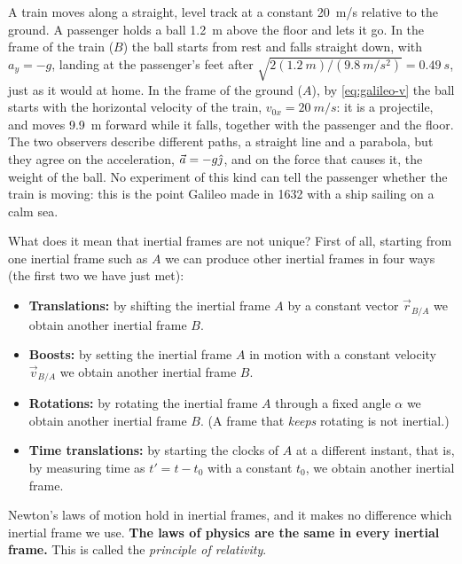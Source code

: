 \documentclass[11pt,a4paper]{article}
\begin{document}
\begin{example}
A train moves along a straight, level track at a constant \qty{20}{m/s} relative to the ground. A
passenger holds a ball \qty{1.2}{m} above the floor and lets it go. In the frame of the train ($B$)
the ball starts from rest and falls straight down, with $a_y = -g$, landing at the passenger's feet
after $\sqrt{2(\qty{1.2}{m})/(\qty{9.8}{m/s^2})} = \qty{0.49}{s}$, just as it would at home. In the
frame of the ground ($A$), by \eqref{eq:galileo-v} the ball starts with the horizontal velocity of
the train, $v_{0x} = \qty{20}{m/s}$: it is a projectile, and moves \qty{9.9}{m} forward while it
falls, together with the passenger and the floor. The two observers describe different paths, a
straight line and a parabola, but they agree on the acceleration, $\vec{a} = -g\hat{\jmath}$, and on the
force that causes it, the weight of the ball. No experiment of this kind can tell the passenger
whether the train is moving: this is the point Galileo made in 1632 with a ship sailing on a calm
sea.
\end{example}

What does it mean that inertial frames are not unique? First of all, starting from one inertial
frame such as $A$ we can produce other inertial frames in four ways (the first two we have just
met):
\begin{itemize}
  \item \textbf{Translations:} by shifting the inertial frame $A$ by a constant vector
    $\vec{r}_{B/A}$ we obtain another inertial frame $B$.
  \item \textbf{Boosts:} by setting the inertial frame $A$ in motion with a constant velocity
    $\vec{v}_{B/A}$ we obtain another inertial frame $B$.
  \item \textbf{Rotations:} by rotating the inertial frame $A$ through a fixed angle $\alpha$ we
    obtain another inertial frame $B$. (A frame that \emph{keeps} rotating is not inertial.)
  \item \textbf{Time translations:} by starting the clocks of $A$ at a different instant, that is,
    by measuring time as $t' = t - t_0$ with a constant $t_0$, we obtain another inertial frame.
\end{itemize}
Newton's laws of motion hold in inertial frames, and it makes no difference which inertial frame we
use. \textbf{The laws of physics are the same in every inertial frame.} This is called the
\emph{principle of relativity}.
\end{document}
